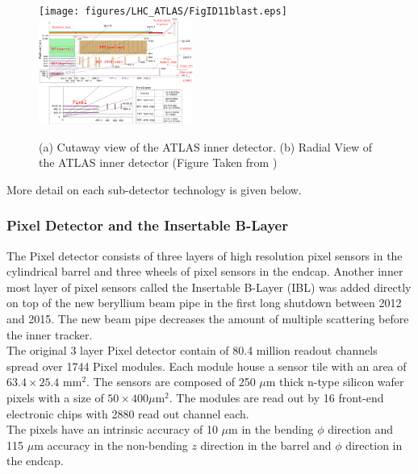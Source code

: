 \begin{figure}[h!]
\centering
\texttt{[image: figures/LHC\_ATLAS/FigID11blast.eps]}
\includegraphics[width=0.45\textwidth, angle=0]{figures/LHC_ATLAS/FigID26-mod-011107.eps}
\caption{ (a) Cutaway view of the ATLAS inner detector. (b) Radial View of the ATLAS inner detector (Figure Taken from \cite{ATLAS_JINST}) \label{LHC:fig:ATLASID}}
\end{figure}

\indent More detail on each sub-detector technology is given below. \\

\subsubsection*{ Pixel Detector and the Insertable B-Layer}

\indent The Pixel detector consists of three layers of high resolution pixel sensors in the cylindrical barrel and three wheels of pixel sensors in the endcap.  Another inner most layer of pixel sensors called the Insertable B-Layer (IBL) was added directly on top of the new beryllium beam pipe in the first long shutdown between 2012 and 2015.  The new beam pipe decreases the amount of multiple scattering before the inner tracker. \\

\indent The original 3 layer Pixel detector contain of 80.4 million readout channels spread over 1744 Pixel modules.  Each module house a sensor tile with an area of $63.4 \times 25.4$ mm$^2$.  The sensors are composed of 250 $\mu$m thick n-type silicon wafer pixels with a size of $50\times400 \mu$m$^2$. The modules are read out by 16 front-end electronic chips with 2880 read out channel each. \\

\indent The pixels have an intrinsic accuracy of 10 $\mu$m in the bending $\phi$ direction and 115 $\mu$m accuracy in the non-bending $z$ direction in the barrel and $\phi$ direction in the endcap.\\ 

